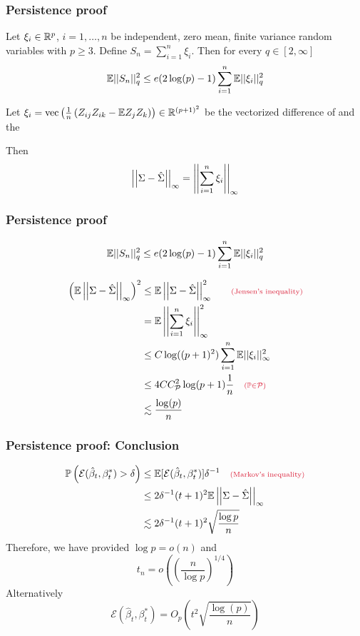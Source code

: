 \documentclass[12pt]{beamer}
\newcommand{\parenthetical}[2]{#1  \scriptstyle \alr{( #2)}}
\begin{document}
  \begin{frame}
  \frametitle{Persistence proof}
  Let $\xi_i  \in \mathbb{R}^p$, $i=1,\ldots,n$ be independent, zero mean, finite variance
random variables with $p \geq 3$.  Define $S_n = \sum_{i=1}^n \xi_i$. 
Then for every $q \in [2,\infty]$
\[
\mathbb{E} ||S_n ||_q^2 \leq e(2\log(p)-1)\sum_{i=1}^n \mathbb{E} ||\xi_i||_q^2
\]

\vsp
Let $\xi_i = \textrm{vec}\left(\frac{1}{n} \left(Z_{ij}Z_{ik} - \mathbb{E} Z_{j}Z_{k}\right) \right) \in \mathbb{R}^{(p+1)^2}$ be the vectorized
difference of  and the 

\vsp
Then
\[
\left|\left| \Sigma - \hat\Sigma \right|\right|_{\infty}   = \left|\left|  \sum_{i=1}^n \xi_i \right|\right|_\infty
\]
\end{frame}


  \begin{frame}
  \frametitle{Persistence proof}

\[
\mathbb{E} ||S_n ||_q^2 \leq e(2\log(p)-1) \sum_{i=1}^n \mathbb{E} ||\xi_i||_q^2
\]

\begin{align*}
\left(\E\norm{\Sigma - \hat\Sigma}_{\infty} \right)^2
& \leq
\E\norm{\Sigma - \hat\Sigma}_{\infty}^2  \parenthetical{\qquad}{\textrm{Jensen's inequality}}\\
 & = 
\E \norm{ \sum_{i=1}^n \xi_i}_\infty^2 \\
 & \leq C \log( (p+1)^2)
\sum_{i=1}^n \E || \xi_i||_\infty^2 \\
 & \leq 4CC_{\mathcal{P}}^2 \log( p+1 ) \frac{1}{n} \parenthetical{\quad}{\P \in \mathcal{P}}\\
 & \lesssim \frac{\log(p)}{n}
\end{align*}
\end{frame}

  \begin{frame}
  \frametitle{Persistence proof: Conclusion}
  \begin{align}
\P\left(   \mathcal{E}(\hat\beta_t,\beta_t^*)  > \delta\right)
  & \leq
  \E[\mathcal{E}(\hat\beta_t,\beta_t^*) ] \delta^{-1} \parenthetical{\quad}{\textrm{Markov's inequality}}\\
& \leq   
  2\delta^{-1}(t+1)^2 \E \norm{\Sigma - \hat\Sigma}_{\infty}   \\
  & \lesssim
  2\delta^{-1}(t+1)^2 \sqrt{\frac{\log p}{n}}
    \end{align}
Therefore, we have  provided $\log p = o(n)$ and
\[
t_n = o\left( \left(\frac{n}{\log p} \right)^{1/4} \right)
\]
Alternatively
\[
\mathcal{E}(\hat\beta_t,\beta_t^*) = O_p\left( t^2\sqrt{\frac{\log(p)}{n}}\right)
\]

\end{frame}
\end{document}
